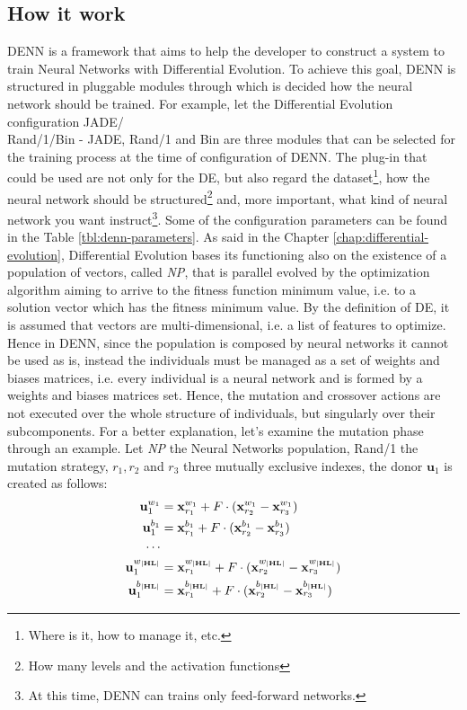 \subsection{How it work}
DENN is a framework that aims to help the developer to construct a system to train Neural Networks with Differential Evolution. To achieve this goal, DENN is structured in pluggable modules through which is decided how the neural network should be trained. For example, let the Differential Evolution configuration JADE/\\Rand/1/Bin - JADE, Rand/1 and Bin are three modules that can be selected for the training process at the time of configuration of DENN. The plug-in that could be used are not only for the DE, but also regard the dataset\footnote{Where is it, how to manage it, etc.}, how the neural network should be structured\footnote{How many levels and the activation functions} and, more important, what kind of neural network you want instruct\footnote{At this time, DENN can trains only feed-forward networks.}. Some of the configuration parameters can be found in the Table \ref{tbl:denn-parameters}.\newline\newline
As said in the Chapter \ref{chap:differential-evolution}, Differential Evolution bases its functioning also on the existence of a population of vectors, called \textit{NP}, that is parallel evolved by the optimization algorithm aiming to arrive to the fitness function minimum value, i.e. to a solution vector which has the fitness minimum value. By the definition of DE, it is assumed that vectors are multi-dimensional, i.e. a list of features to optimize. Hence in DENN, since the population is composed by neural networks it cannot be used as is, instead the individuals must be managed as a set of weights and biases matrices, i.e. every individual is a neural network and is formed by a weights and biases matrices set. Hence, the mutation and crossover actions are not executed over the whole structure of individuals, but singularly over their subcomponents.\newline\newline
For a better explanation, let's examine the mutation phase through an example. Let \textit{NP} the Neural Networks population, Rand/1 the mutation strategy, $r_1, r_2$ and $r_3$ three mutually exclusive indexes, the donor $\textbf{u}_{1}$ is created as follows:
\begin{align}
	\textbf{u}_{1}^{w_1} &= \textbf{x}_{r_1}^{w_1} + F \cdot (\textbf{x}_{r_2}^{w_1} - \textbf{x}_{r_3}^{w_1}) \\
	\textbf{u}_{1}^{b_1} &= \textbf{x}_{r_1}^{b_1} + F \cdot (\textbf{x}_{r_2}^{b_1} - \textbf{x}_{r_3}^{b_1}) \\
	\cdots \cr
	\textbf{u}_{1}^{w_{|\textbf{HL}|}} &= \textbf{x}_{r_1}^{w_{|\textbf{HL}|}} + F \cdot (\textbf{x}_{r_2}^{w_{|\textbf{HL}|}} - \textbf{x}_{r_3}^{w_{|\textbf{HL}|}}) \\
	\textbf{u}_{1}^{b_{|\textbf{HL}|}} &= \textbf{x}_{r_1}^{b_{|\textbf{HL}|}} + F \cdot (\textbf{x}_{r_2}^{b_{|\textbf{HL}|}} - \textbf{x}_{r_3}^{b_{|\textbf{HL}|}})
\end{align}
